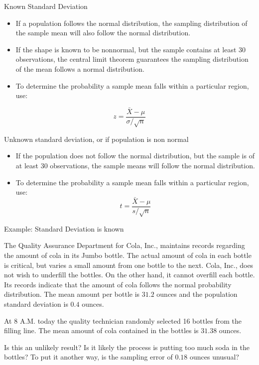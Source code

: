 \documentclass[ignorenonframetext,]{beamer}
\begin{document}
\begin{frame}{Known Standard Deviation}

\begin{itemize}
\item
  If a population follows the normal distribution, the sampling
  distribution of the sample mean will also follow the normal
  distribution.
\item
  If the shape is known to be nonnormal, but the sample contains at
  least 30 observations, the central limit theorem guarantees the
  sampling distribution of the mean follows a normal distribution.
\item
  To determine the probability a sample mean falls within a particular
  region, use:
\end{itemize}

\[z=\frac{\bar{X}-\mu}{\sigma/\sqrt{n}}\]

\end{frame}

\begin{frame}{Unknown standard deviation, or if population is non
normal}

\begin{itemize}
\item
  If the population does not follow the normal distribution, but the
  sample is of at least 30 observations, the sample means will follow
  the normal distribution.
\item
  To determine the probability a sample mean falls within a particular
  region, use: \[t=\frac{\bar{X}-\mu}{s/\sqrt{n}}\]
\end{itemize}

\end{frame}

\begin{frame}{Example: Standard Deviation is known}

The Quality Assurance Department for Cola, Inc., maintains records
regarding the amount of cola in its Jumbo bottle. The actual amount of
cola in each bottle is critical, but varies a small amount from one
bottle to the next. Cola, Inc., does not wish to underfill the bottles.
On the other hand, it cannot overfill each bottle. Its records indicate
that the amount of cola follows the normal probability distribution. The
mean amount per bottle is \(31.2\) ounces and the population standard
deviation is \(0.4\) ounces.

At \(8\) A.M. today the quality technician randomly selected 16 bottles
from the filling line. The mean amount of cola contained in the bottles
is \(31.38\) ounces.

Is this an unlikely result? Is it likely the process is putting too much
soda in the bottles? To put it another way, is the sampling error of
\(0.18\) ounces unusual?

\end{frame}
\end{document}
